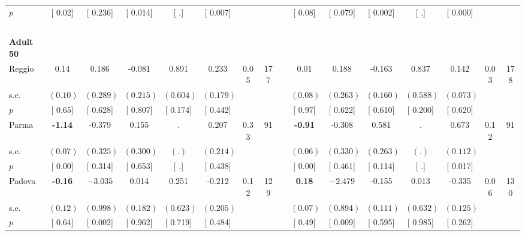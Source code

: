 \begin{longtable}{L{8em} c c c c c c c p{1em} c c c c c c c}
\quad \quad \quad \quad $ p$ & [     0.02] & [    0.236] & [    0.014] & [        .] & [    0.007] & & & & [     0.08] & [    0.079] & [    0.002] & [        .] & [    0.000] & &  \\[1em]
~\\[1em]
\quad \quad \textbf{Adult 50} & & & & & & & & & & & & & & & \\* 
\quad \quad \quad Reggio& 0.14 &     0.186 &    -0.081 &     0.891 &     0.233 &      0.05 &       177 & & 0.01 &     0.188 &    -0.163 &     0.837 &     0.142 &      0.03 &       178  \\*
\quad \quad \quad \quad s.e.& $ (     0.10)$ & $ (    0.289)$ & $ (    0.215)$ & $ (    0.604)$ & $ (    0.179)$ & & & & $ (     0.08)$ & $ (    0.263)$ & $ (    0.160)$ & $ (    0.588)$ & $ (    0.073)$ & &  \\*
\quad \quad \quad \quad $ p$ & [     0.65] & [    0.628] & [    0.807] & [    0.174] & [    0.442] & & & & [     0.97] & [    0.622] & [    0.610] & [    0.200] & [    0.620] & &  \\[1em]
\quad \quad \quad Parma& \textbf{    -1.14} &    -0.379 &     0.155 &         . &     0.207 &      0.33 &        91 & & \textbf{    -0.91} &    -0.308 &     0.581 &         . & $ \mathbf{    0.673}$ &      0.12 &        91  \\*
\quad \quad \quad \quad s.e.& $ (     0.07)$ & $ (    0.325)$ & $ (    0.300)$ & $ (        .)$ & $ (    0.214)$ & & & & $ (     0.06)$ & $ (    0.330)$ & $ (    0.263)$ & $ (        .)$ & $ (    0.112)$ & &  \\*
\quad \quad \quad \quad $ p$ & [     0.00] & [    0.314] & [    0.653] & [        .] & [    0.438] & & & & [     0.00] & [    0.461] & [    0.114] & [        .] & [    0.017] & &  \\[1em]
\quad \quad \quad Padova& \textbf{    -0.16} & $ \mathbf{   -3.035}$ &     0.014 &     0.251 &    -0.212 &      0.12 &       129 & & \textbf{     0.18} & $ \mathbf{   -2.479}$ &    -0.155 &     0.013 &    -0.335 &      0.06 &       130  \\*
\quad \quad \quad \quad s.e.& $ (     0.12)$ & $ (    0.998)$ & $ (    0.182)$ & $ (    0.623)$ & $ (    0.205)$ & & & & $ (     0.07)$ & $ (    0.894)$ & $ (    0.111)$ & $ (    0.632)$ & $ (    0.125)$ & &  \\*
\quad \quad \quad \quad $ p$ & [     0.64] & [    0.002] & [    0.962] & [    0.719] & [    0.484] & & & & [     0.49] & [    0.009] & [    0.595] & [    0.985] & [    0.262] & &  \\[1em]

\end{longtable}
